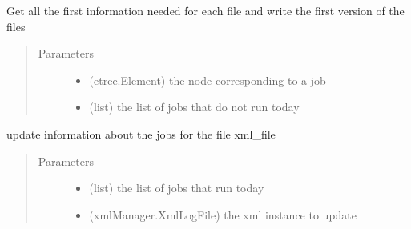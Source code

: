 \documentclass[a4paper,10pt,english]{sphinxmanual}
\begin{document}
\begin{fulllineitems}
\begin{fulllineitems}
\end{fulllineitems}


\begin{fulllineitems}
\label{\detokenize{apidoc_commands/commands:commands.jobs.Gui.put_jobs_not_today}}
Get all the first information needed for each file and write the 
first version of the files
\begin{quote}\begin{description}
\item[{Parameters}] \leavevmode\begin{itemize}
\item {} 
 \textendash{} (etree.Element) 
the node corresponding to a job

\item {} 
 \textendash{} (list) 
the list of jobs that do not run today

\end{itemize}

\end{description}\end{quote}

\end{fulllineitems}


\begin{fulllineitems}
\label{\detokenize{apidoc_commands/commands:commands.jobs.Gui.update_xml_file}}
update information about the jobs for the file xml\_file
\begin{quote}\begin{description}
\item[{Parameters}] \leavevmode\begin{itemize}
\item {} 
 \textendash{} (list) the list of jobs that run today

\item {} 
 \textendash{} (xmlManager.XmlLogFile) 
the xml instance to update


\end{itemize}
\end{description}
\end{quote}
\end{fulllineitems}
\end{fulllineitems}
\end{document}
